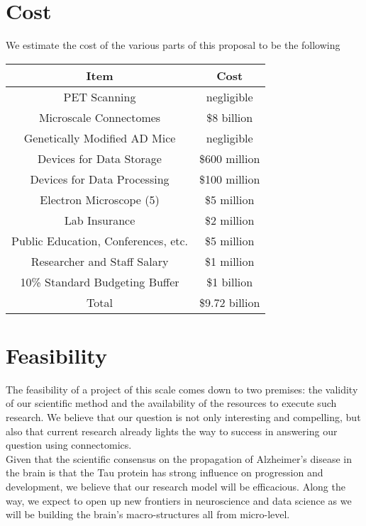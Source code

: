 \documentclass{article}
\newcommand{\ind}[0]{\indent}
\begin{document}
\section{Cost}

\ind\ind We estimate the cost of the various parts of this proposal to be the following \\

\begin{center}
 \begin{tabular}{||c c||} 
 \hline
 Item & Cost \\ [0.5ex] 
 \hline\hline
 PET Scanning & negligible \\ 
 \hline
 Microscale Connectomes & \$8 billion \\
 \hline
 Genetically Modified AD Mice & negligible \\
 \hline
 Devices for Data Storage & \$600 million  \\
 \hline
 Devices for Data Processing & \$100 million  \\
 \hline
 Electron Microscope (5) &  \$5 million\\ 
 \hline
 Lab Insurance & \$2 million \\ 
 \hline
 Public Education, Conferences, etc. & \$5 million \\ 
 \hline
 Researcher and Staff Salary & \$1 million \\ 
 \hline
 10\% Standard Budgeting Buffer & \$1 billion \\[1ex] 
 \hline\hline
 Total & \$9.72 billion \\
 \hline
\end{tabular}
\end{center}

\section{Feasibility} 

\ind\ind The feasibility of a project of this scale comes down to two premises: the validity of our scientific method and the availability of the resources to execute such research. We believe that our question is not only interesting and compelling, but also that current research already lights the way to success in answering our question using connectomics. \\

Given that the scientific consensus on the propagation of Alzheimer’s disease in the brain is that the Tau protein has strong influence on progression and development, we believe that our research model will be efficacious. Along the way, we expect to open up new frontiers in neuroscience and data science as we will be building the brain’s macro-structures all from micro-level. \\
\end{document}
